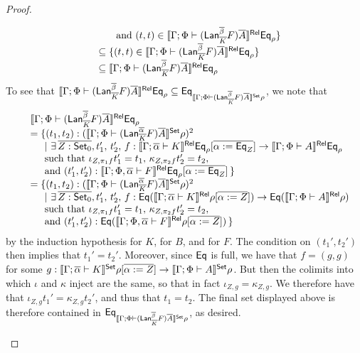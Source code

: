 \documentclass[acmsmall,review,anonymous]{acmart}
\theoremstyle{definition}
\begin{document}
\begin{proof}
\begin{itemize}
\[\begin{array}{ll}
&\hspace*{0.2in}\mbox{ and } (t,t) \in \llbracket{\Gamma;\Phi \vdash
  (\mathsf{Lan}_{\overline{K}}^{\overline{\beta}} F)\overline{A}}\rrbracket^{\mathsf{Rel}}\mathsf{Eq}_\rho\}\\
&\subseteq \{ (t,t) \in \llbracket{\Gamma;\Phi \vdash
  (\mathsf{Lan}_{\overline{K}}^{\overline{\beta}} F)\overline{A}}\rrbracket^{\mathsf{Rel}}\mathsf{Eq}_\rho\}\\
&\subseteq \llbracket{\Gamma;\Phi \vdash (\mathsf{Lan}_{\overline{K}}^{\overline{\beta}}
  F)\overline{A}}\rrbracket^{\mathsf{Rel}}\mathsf{Eq}_\rho\\ 
\end{array}\]
To see that $\llbracket{\Gamma; \Phi \vdash (\mathsf{Lan}_{\overline{K}}^{\overline{\beta}}
  F)\overline{A}}\rrbracket^{\mathsf{Rel}}\mathsf{Eq}_\rho \subseteq \mathsf{Eq}_{\llbracket{\Gamma; \Phi \vdash
    (\mathsf{Lan}_{\overline{K}}^{\overline{\beta}} F)\overline{A}}\rrbracket^{\mathsf{Set}}\rho}$, we note that
\[\begin{array}{ll}
&\llbracket{\Gamma;\Phi \vdash (\mathsf{Lan}_{\overline{K}}^{\overline{\beta}}
  F)\overline{A}}\rrbracket^{\mathsf{Rel}}\mathsf{Eq}_\rho\\
&= \{ (t_1, t_2) : (\llbracket{\Gamma;\Phi \vdash
    (\mathsf{Lan}^{\overline{\alpha}}_{\overline{K}} F)\overline{A}}\rrbracket^{\mathsf{Set}}\rho)^2\\
  &\hspace{0.2in}|~\exists\, \overline{Z : {\mathsf{Set}}_0}, t_1',\, t_2',\,
 f : \llbracket{\Gamma; \overline{\alpha} \vdash K}\rrbracket^{\mathsf{Rel}}\mathsf{Eq}_\rho[\overline{\alpha := \mathsf{Eq}_Z}] \to
  \llbracket{\Gamma; \Phi \vdash A}\rrbracket^{\mathsf{Rel}}\mathsf{Eq}_\rho\\
  &\hspace{0.2in}\mbox{such that } \iota_{Z,\pi_1 f}t_1' = t_1,\,
  \kappa_{Z,\pi_2 f}t_2' = t_2,\\
  &  \hspace*{0.2in}\mbox{and } (t_1',t_2') :
  \llbracket{\Gamma; \Phi, \overline{\alpha} \vdash F}\rrbracket^{\mathsf{Rel}}\mathsf{Eq}_\rho[\overline{\alpha :=
      \mathsf{Eq}_Z}]\,\}\\
&= \{ (t_1, t_2) : (\llbracket{\Gamma;\Phi \vdash
    (\mathsf{Lan}^{\overline{\alpha}}_{\overline{K}} F)\overline{A}}\rrbracket^{\mathsf{Set}}\rho)^2\\
  &\hspace{0.2in}|~\exists\, \overline{Z : {\mathsf{Set}}_0}, t_1',\, t_2',\,
 f : \mathsf{Eq} (\llbracket{\Gamma; \overline{\alpha} \vdash K}\rrbracket^{\mathsf{Rel}}\rho[\overline{\alpha := Z}]) \to
  \mathsf{Eq} (\llbracket{\Gamma; \Phi \vdash A}\rrbracket^{\mathsf{Rel}}\rho)\\
  &\hspace{0.2in}\mbox{such that } \iota_{Z,\pi_1 f}t_1' = t_1,\,
  \kappa_{Z,\pi_2 f}t_2' = t_2,\\
  &  \hspace*{0.2in}\mbox{and } (t_1',t_2') :
  \mathsf{Eq} (\llbracket{\Gamma; \Phi, \overline{\alpha} \vdash F}\rrbracket^{\mathsf{Rel}}\rho[\overline{\alpha := Z}])\,\}
\end{array}\]
by the induction hypothesis for $K$, for $B$, and for $F$. The
condition on $(t_1', t_2')$ then implies that $t_1'=t_2'$.  Moreover,
since $\mathsf{Eq}$ is full, we have that $f = (g,g)$ for some $g :
\llbracket{\Gamma; \overline{\alpha} \vdash K}\rrbracket^{\mathsf{Set}}\rho[\overline{\alpha := Z}] \to
\llbracket{\Gamma; \Phi \vdash A}\rrbracket^{\mathsf{Set}}\rho$. But then the colimits into which
$\iota$ and $\kappa$ inject are the same, so that in fact $\iota_{Z,g}
= \kappa_{Z,g}$. We therefore have that $\iota_{Z,g} t_1' =
\kappa_{Z,g} t_2'$, and thus that $t_1 = t_2$. The final set displayed
above is therefore contained in $ \mathsf{Eq}_{\llbracket{\Gamma; \Phi \vdash
    (\mathsf{Lan}_{\overline{K}}^{\overline{\beta}} F)\overline{A}}\rrbracket^{\mathsf{Set}}\rho}$, as desired.

\end{itemize}
\end{proof}
\end{document}
